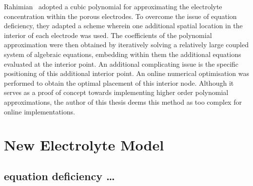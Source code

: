 Rahimian~\etal{} adopted  a cubic  polynomial for approximating  the electrolyte
concentration within  the porous electrodes.  To overcome the issue  of equation
deficiency, they adapted a scheme wherein one additional spatial location in the
interior  of  each  electrode  was  used. The  coefficients  of  the  polynomial
approximation  were then  obtained  by iteratively  solving  a relatively  large
coupled  system of  algebraic equations,  embedding within  them the  additional
equations evaluated at  the interior point. An additional  complicating issue is
the specific positioning of this  additional interior point. An online numerical
optimisation  was performed  to obtain  the optimal  placement of  this interior
node. Although it serves as a proof of concept towards implementing higher order
polynomial approximations,  the author of this  thesis deems this method  as too
complex for online implementations.

\section{New Electrolyte Model}\label{sec:newelectrolytemodel}



\subsection{equation deficiency \dots}\label{temp:eqndeficiency}










